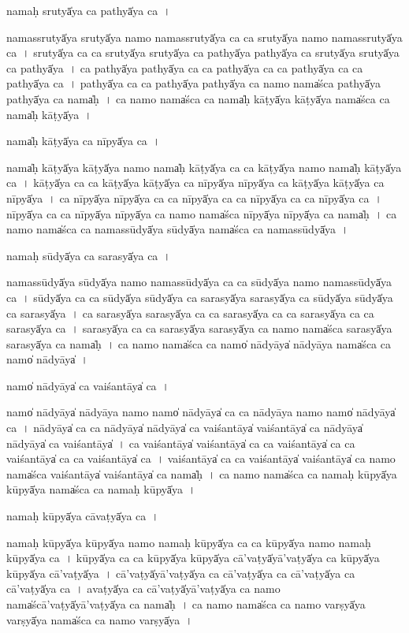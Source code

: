 \documentclass[parskip, DIV=14]{scrartcl}
\begin{document}
{nama॒ḥ srutyā̍ya ca॒ pathyā̍ya ca॒~।

nama॒ssrutyā̍ya॒ srutyā̍ya॒ namo॒ nama॒ssrutyā̍ya ca ca॒ srutyā̍ya॒ namo॒ nama॒ssrutyā̍ya ca~।
srutyā̍ya ca ca॒ srutyā̍ya॒ srutyā̍ya ca॒ pathyā̍ya॒ pathyā̍ya ca॒ srutyā̍ya॒ srutyā̍ya ca॒ pathyā̍ya~।
ca॒ pathyā̍ya॒ pathyā̍ya ca ca॒ pathyā̍ya ca ca॒ pathyā̍ya ca ca॒ pathyā̍ya ca~।
pathyā̍ya ca ca॒ pathyā̍ya॒ pathyā̍ya ca॒ namo॒ nama̍śca॒ pathyā̍ya॒ pathyā̍ya ca॒ nama̍ḥ~।
ca॒ namo॒ nama̍śca ca॒ nama̍ḥ kā॒ṭyā̍ya kā॒ṭyā̍ya॒ nama̍śca ca॒ nama̍ḥ kā॒ṭyā̍ya~।

nama̍ḥ kā॒ṭyā̍ya ca nī॒pyā̍ya ca॒~।

nama̍ḥ kā॒ṭyā̍ya kā॒ṭyā̍ya॒ namo॒ nama̍ḥ kā॒ṭyā̍ya ca ca kā॒ṭyā̍ya॒ namo॒ nama̍ḥ kā॒ṭyā̍ya ca~।
kā॒ṭyā̍ya ca ca kā॒ṭyā̍ya kā॒ṭyā̍ya ca nī॒pyā̍ya nī॒pyā̍ya ca kā॒ṭyā̍ya kā॒ṭyā̍ya ca nī॒pyā̍ya~।
ca॒ nī॒pyā̍ya nī॒pyā̍ya ca ca nī॒pyā̍ya ca ca nī॒pyā̍ya ca ca nī॒pyā̍ya ca~।
nī॒pyā̍ya ca ca nī॒pyā̍ya nī॒pyā̍ya ca॒ namo॒ nama̍śca nī॒pyā̍ya nī॒pyā̍ya ca॒ nama̍ḥ~।
ca॒ namo॒ nama̍śca ca॒ nama॒ssūdyā̍ya॒ sūdyā̍ya॒ nama̍śca ca॒ nama॒ssūdyā̍ya~।

nama॒ḥ sūdyā̍ya ca sara॒syā̍ya ca॒~।

nama॒ssūdyā̍ya॒ sūdyā̍ya॒ namo॒ nama॒ssūdyā̍ya ca ca॒ sūdyā̍ya॒ namo॒ nama॒ssūdyā̍ya ca~।
sūdyā̍ya ca ca॒ sūdyā̍ya॒ sūdyā̍ya ca sara॒syā̍ya sara॒syā̍ya ca॒ sūdyā̍ya॒ sūdyā̍ya ca sara॒syā̍ya~।
ca॒ sa॒ra॒syā̍ya sara॒syā̍ya ca ca sara॒syā̍ya ca ca sara॒syā̍ya ca ca sara॒syā̍ya ca~।
sa॒ra॒syā̍ya ca ca sara॒syā̍ya sara॒syā̍ya ca॒ namo॒ nama̍śca sara॒syā̍ya sara॒syā̍ya ca॒ nama̍ḥ~।
ca॒ namo॒ nama̍śca ca॒ namo̍ nā॒dyāya̍ nā॒dyāya॒ nama̍śca ca॒ namo̍ nā॒dyāya̍~।

namo̍ nā॒dyāya̍ ca vaiśa॒ntāya̍ ca॒~।

namo̍ nā॒dyāya̍ nā॒dyāya॒ namo॒ namo̍ nā॒dyāya̍ ca ca nā॒dyāya॒ namo॒ namo̍ nā॒dyāya̍ ca~।
nā॒dyāya̍ ca ca nā॒dyāya̍ nā॒dyāya̍ ca vaiśa॒ntāya̍ vaiśa॒ntāya̍ ca nā॒dyāya̍ nā॒dyāya̍ ca vaiśa॒ntāya̍~।
ca॒ vai॒śa॒ntāya̍ vaiśa॒ntāya̍ ca ca vaiśa॒ntāya̍ ca ca vaiśa॒ntāya̍ ca ca vaiśa॒ntāya̍ ca~।
vai॒śa॒ntāya̍ ca ca vaiśa॒ntāya̍ vaiśa॒ntāya̍ ca॒ namo॒ nama̍śca vaiśa॒ntāya̍ vaiśa॒ntāya̍ ca॒  nama̍ḥ~।
ca॒ namo॒ nama̍śca ca॒ nama॒ḥ kūpyā̍ya॒ kūpyā̍ya॒ nama̍śca ca॒ nama॒ḥ kūpyā̍ya~।

nama॒ḥ kūpyā̍ya cāva॒ṭyā̍ya ca॒~।

nama॒ḥ kūpyā̍ya॒ kūpyā̍ya॒ namo॒ nama॒ḥ kūpyā̍ya ca ca॒ kūpyā̍ya॒ namo॒ nama॒ḥ kūpyā̍ya ca~।
kūpyā̍ya ca ca॒ kūpyā̍ya॒ kūpyā̍ya cā'va॒ṭyā̍yā'va॒ṭyā̍ya ca॒ kūpyā̍ya॒ kūpyā̍ya cā'va॒ṭyā̍ya~।
cā॒'va॒ṭyā̍yā'va॒ṭyā̍ya ca cā'va॒ṭyā̍ya ca cā'va॒ṭyā̍ya ca cā'va॒ṭyā̍ya ca~।
a॒va॒ṭyā̍ya ca cā'va॒ṭyā̍yā'va॒ṭyā̍ya ca॒ namo॒ nama̍ścā'va॒ṭyā̍yā'va॒ṭyā̍ya ca॒ nama̍ḥ~।
ca॒ namo॒ nama̍śca ca॒ namo॒ varṣyā̍ya॒ varṣyā̍ya॒ nama̍śca ca॒ namo॒ varṣyā̍ya~।

}
\end{document}
